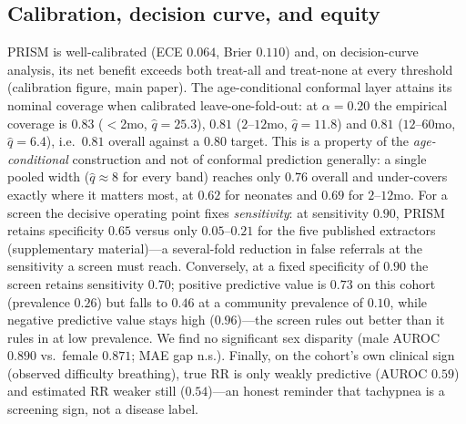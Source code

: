 \subsection{Calibration, decision curve, and equity}\label{sec:calib}
PRISM is well-calibrated (ECE $0.064$, Brier $0.110$) and, on decision-curve analysis, its net benefit
exceeds both treat-all and treat-none at every threshold (calibration figure, main paper). The
age-conditional
conformal layer attains its nominal coverage when calibrated leave-one-fold-out: at $\alpha{=}0.20$ the
empirical coverage is $0.83$ ($<$2mo, $\hat q{=}25.3$), $0.81$ ($2$--$12$mo, $\hat q{=}11.8$) and $0.81$
($12$--$60$mo, $\hat q{=}6.4$), i.e.\ $0.81$ overall against a $0.80$ target. This is a property of the
\emph{age-conditional} construction and not of conformal prediction generally: a single pooled width
($\hat q\approx8$ for every band) reaches only $0.76$ overall and under-covers exactly where it matters
most, at $0.62$ for neonates and $0.69$ for $2$--$12$mo. For a screen the decisive
operating point fixes \emph{sensitivity}: at sensitivity $0.90$, PRISM retains specificity $0.65$ versus
only $0.05$--$0.21$ for the five published extractors (supplementary material)---a several-fold reduction in
false referrals at the sensitivity a screen must reach. Conversely, at a fixed specificity of
$0.90$ the screen retains sensitivity $0.70$; positive predictive value is $0.73$ on this cohort
(prevalence $0.26$) but falls to $0.46$ at a community prevalence of $0.10$, while negative predictive
value stays high ($0.96$)---the screen rules out better than it rules in at low prevalence. We find no
significant
sex disparity (male AUROC $0.890$ vs.\ female $0.871$; MAE gap n.s.). Finally, on the cohort's own
clinical sign (observed difficulty breathing), true RR is only weakly predictive (AUROC $0.59$) and
estimated RR weaker still ($0.54$)---an honest reminder that tachypnea is a screening sign, not a disease
label.


